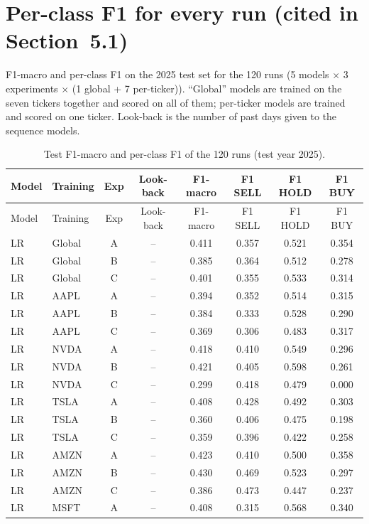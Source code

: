 \documentclass[10pt]{article}
\begin{document}
\section{Per-class F1 for every run (cited in Section~5.1)}
F1-macro and per-class F1 on the 2025 test set for the 120 runs (5 models $\times$
3 experiments $\times$ (1 global + 7 per-ticker)). ``Global'' models are trained on the seven
tickers together and scored on all of them; per-ticker models are trained and scored on one
ticker. Look-back is the number of past days given to the sequence models.

{\small\begin{longtable}{@{}l l c c c c c c@{}}
\caption{Test F1-macro and per-class F1 of the 120 runs (test year 2025).}\label{tab:s2}\\
\toprule Model & Training & Exp & Look-back & F1-macro & F1 SELL & F1 HOLD & F1 BUY \\ \midrule \endfirsthead
\toprule Model & Training & Exp & Look-back & F1-macro & F1 SELL & F1 HOLD & F1 BUY \\ \midrule \endhead
\bottomrule \endlastfoot
LR & Global & A & -- & 0.411 & 0.357 & 0.521 & 0.354 \\
LR & Global & B & -- & 0.385 & 0.364 & 0.512 & 0.278 \\
LR & Global & C & -- & 0.401 & 0.355 & 0.533 & 0.314 \\
LR & AAPL & A & -- & 0.394 & 0.352 & 0.514 & 0.315 \\
LR & AAPL & B & -- & 0.384 & 0.333 & 0.528 & 0.290 \\
LR & AAPL & C & -- & 0.369 & 0.306 & 0.483 & 0.317 \\
LR & NVDA & A & -- & 0.418 & 0.410 & 0.549 & 0.296 \\
LR & NVDA & B & -- & 0.421 & 0.405 & 0.598 & 0.261 \\
LR & NVDA & C & -- & 0.299 & 0.418 & 0.479 & 0.000 \\
LR & TSLA & A & -- & 0.408 & 0.428 & 0.492 & 0.303 \\
LR & TSLA & B & -- & 0.360 & 0.406 & 0.475 & 0.198 \\
LR & TSLA & C & -- & 0.359 & 0.396 & 0.422 & 0.258 \\
LR & AMZN & A & -- & 0.423 & 0.410 & 0.500 & 0.358 \\
LR & AMZN & B & -- & 0.430 & 0.469 & 0.523 & 0.297 \\
LR & AMZN & C & -- & 0.386 & 0.473 & 0.447 & 0.237 \\
LR & MSFT & A & -- & 0.408 & 0.315 & 0.568 & 0.340 \\

\end{longtable}}
\end{document}
